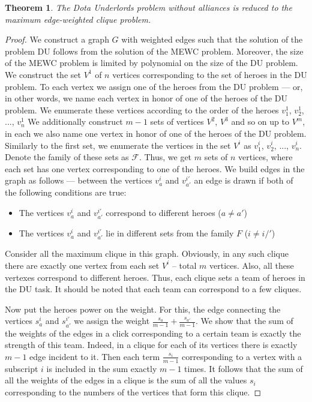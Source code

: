 \documentclass{article}
\newtheorem{theorem}{Theorem}
\begin{document}
\begin{theorem}
\label{trivial_case}
    The Dota Underlords problem without alliances is reduced to the  maximum edge-weighted clique problem.
\end{theorem}
\begin{proof}
    
   We construct a graph $G$ with weighted edges such that the solution of the problem DU follows from the solution of the MEWC problem. Moreover, the size of the MEWC problem is limited by polynomial on the size of the DU problem.
    We construct the set $V^1 $ of $n$ vertices corresponding to the set of heroes in the DU problem. To each vertex we assign one of the heroes from the DU problem --- or, in other words, we name each vertex in honor of one of the heroes of the DU problem. We enumerate these vertices according to the order of the heroes $v_1^1$, $v_2^1$, ..., $ v_n^1$
    We additionally construct $m-1$ sets of vertices $ V^2 $, $ V^3 $ and so on up to $ V^m $, in each we also name one vertex in honor of one of the heroes of the DU problem. Similarly to the first set, we enumerate the vertices in the set $V^i $ as $ v_1^i $, $v_2^i$, ..., $v_n^i$.
    Denote the family of these sets as $ \mathcal{F} $. Thus, we get $m$ sets of $n$ vertices, where each set has one vertex corresponding to one of the heroes.
   We build edges in the graph as follows ---  between the vertices $v_a^i $ and $v_{a'}^{i'} $ an edge is drawn if both of the following conditions are true:
    \begin{itemize}
        \item The vertices $v_a^i $ and $v_{a'}^{i'} $ correspond to different heroes ($a \neq a'$)
        \item The vertices $v_a^i $ and $v_{a'}^{i'} $ lie in different sets from the family $F$ ($ i \neq i /'$)
    \end{itemize}

    Consider all the maximum clique in this graph. Obviously, in any such clique there are exactly one vertex from each set $ V^i $ -- total $m$ vertices. Also, all these vertexes correspond to different heroes. Thus, each clique sets a team of heroes in the DU task. It should be noted that each team can correspond to a few cliques.
  
    Now put the heroes power on the weight. For this, the edge connecting the vertices $s_a^i$ and $s_ {a'}^{i'}$ we assign the weight $ \frac{s_a}{m-1} + \frac{s_{a '}}{m-1}$. We show that the sum of the weights of the edges in a click corresponding to a certain team is exactly the strength of this team.
    Indeed, in a clique for each of its vertices there is exactly $m-1$ edge incident to it. Then each term $\frac{s_i}{m-1}$ corresponding to a vertex with a subscript $i$ is included in the sum exactly $m-1$ times. It follows that the sum of all the weights of the edges in a clique is the sum 
of all the values $s_i$ corresponding to the numbers of the vertices that form this clique.      
\end{proof}
\end{document}

